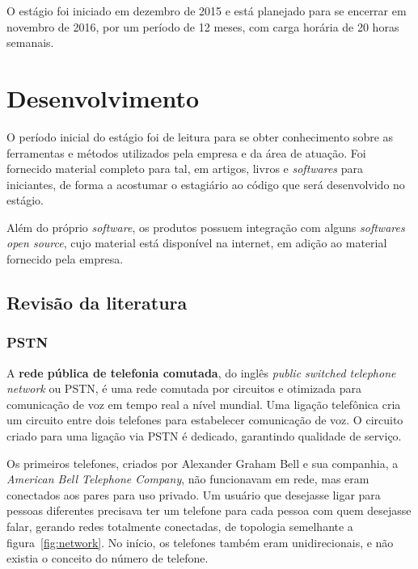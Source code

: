 \documentclass[12pt]{article}
\begin{document}
O estágio foi iniciado em dezembro de 2015 e está planejado para se encerrar em
novembro de 2016, por um período de 12 meses, com carga horária de 20 horas
semanais.

\section{Desenvolvimento}

O período inicial do estágio foi de leitura para se obter conhecimento sobre
as ferramentas e métodos utilizados pela empresa e da área de atuação. Foi
fornecido material completo para tal, em artigos, livros e \textit{softwares}
para iniciantes, de forma a acostumar o estagiário ao código que será
desenvolvido no estágio.

Além do próprio \textit{software}, os produtos possuem integração com alguns
\textit{softwares open source}, cujo material está disponível na internet, em
adição ao material fornecido pela empresa.

\subsection{Revisão da literatura}

\subsubsection{PSTN}

A \textbf{rede pública de telefonia comutada}, do inglês
\textit{public switched telephone network} ou PSTN, é uma rede comutada por
circuitos e otimizada para comunicação de voz em tempo real a nível mundial.
Uma ligação telefônica cria um circuito entre dois telefones para estabelecer
comunicação de voz. O circuito criado para uma ligação via PSTN é dedicado,
garantindo qualidade de serviço.

Os primeiros telefones, criados por Alexander Graham Bell e sua companhia, a
\textit{American Bell Telephone Company}, não funcionavam em rede, mas eram
conectados aos pares para uso privado. Um usuário que desejasse ligar para
pessoas diferentes precisava ter um telefone para cada pessoa com quem
desejasse falar, gerando redes totalmente conectadas, de topologia semelhante a
figura~\ref{fig:network}. No início, os telefones também eram unidirecionais, e
não existia o conceito do número de telefone.
\end{document}
